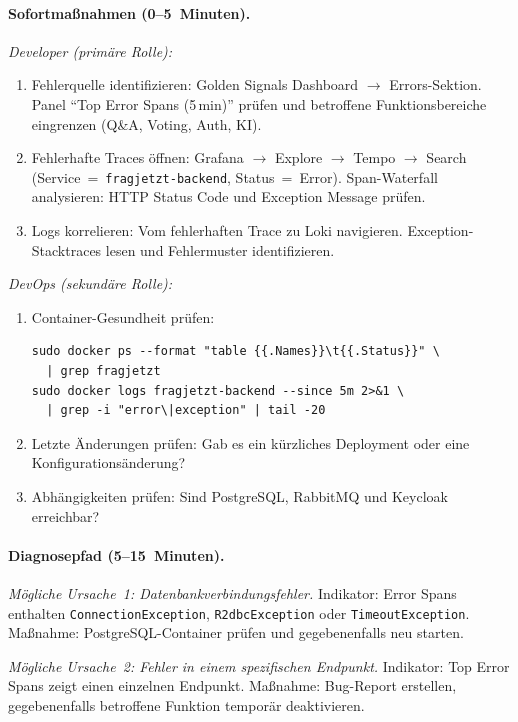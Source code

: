 \paragraph{Sofortmaßnahmen (0--5~Minuten).}

\emph{Developer (primäre Rolle):}
\begin{enumerate}
  \item Fehlerquelle identifizieren: Golden Signals Dashboard $\rightarrow$ Errors-Sektion. Panel \enquote{Top Error Spans (5\,min)} prüfen und betroffene Funktionsbereiche eingrenzen (Q\&A, Voting, Auth, KI).
  \item Fehlerhafte Traces öffnen: Grafana $\rightarrow$ Explore $\rightarrow$ Tempo $\rightarrow$ Search (Service~=~\texttt{fragjetzt-backend}, Status~=~Error). Span-Waterfall analysieren: HTTP Status Code und Exception Message prüfen.
  \item Logs korrelieren: Vom fehlerhaften Trace zu Loki navigieren. Exception-Stacktraces lesen und Fehlermuster identifizieren.
\end{enumerate}
\clearpage
\emph{DevOps (sekundäre Rolle):}
\begin{enumerate}
  \item Container-Gesundheit prüfen:
\begin{lstlisting}[style=bashstyle]
sudo docker ps --format "table {{.Names}}\t{{.Status}}" \
  | grep fragjetzt
sudo docker logs fragjetzt-backend --since 5m 2>&1 \
  | grep -i "error\|exception" | tail -20
\end{lstlisting}
  \item Letzte Änderungen prüfen: Gab es ein kürzliches Deployment oder eine Konfigurationsänderung?
  \item Abhängigkeiten prüfen: Sind PostgreSQL, RabbitMQ und Keycloak erreichbar?
\end{enumerate}

\paragraph{Diagnosepfad (5--15~Minuten).}

\emph{Mögliche Ursache~1: Datenbankverbindungsfehler.} Indikator: Error Spans enthalten \texttt{ConnectionException}, \texttt{R2dbcException} oder \texttt{TimeoutException}. Maßnahme: PostgreSQL-Container prüfen und gegebenenfalls neu starten.

\emph{Mögliche Ursache~2: Fehler in einem spezifischen Endpunkt.} Indikator: Top Error Spans zeigt einen einzelnen Endpunkt. Maßnahme: Bug-Report erstellen, gegebenenfalls betroffene Funktion temporär deaktivieren.

